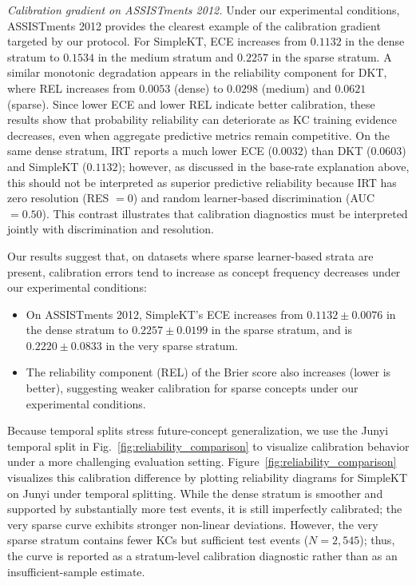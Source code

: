 \textit{Calibration gradient on ASSISTments 2012.}
Under our experimental conditions, ASSISTments 2012 provides the clearest example of the calibration gradient targeted by our protocol. For SimpleKT, ECE increases from $0.1132$ in the dense stratum to $0.1534$ in the medium stratum and $0.2257$ in the sparse stratum. A similar monotonic degradation appears in the reliability component for DKT, where REL increases from $0.0053$ (dense) to $0.0298$ (medium) and $0.0621$ (sparse). Since lower ECE and lower REL indicate better calibration, these results show that probability reliability can deteriorate as KC training evidence decreases, even when aggregate predictive metrics remain competitive. On the same dense stratum, IRT reports a much lower ECE ($0.0032$) than DKT ($0.0603$) and SimpleKT ($0.1132$); however, as discussed in the base‑rate explanation above, this should not be interpreted as superior predictive reliability because IRT has zero resolution (RES $=0$) and random learner‑based discrimination (AUC $=0.50$). This contrast illustrates that calibration diagnostics must be interpreted jointly with discrimination and resolution.

Our results suggest that, on datasets where sparse learner-based strata are present, calibration errors tend to increase as concept frequency decreases under our experimental conditions:
\begin{itemize}
    \item On ASSISTments 2012, SimpleKT's ECE increases from $0.1132 \pm 0.0076$ in the dense stratum to $0.2257 \pm 0.0199$ in the sparse stratum, and is $0.2220 \pm 0.0833$ in the very sparse stratum.
    \item The reliability component (REL) of the Brier score also increases (lower is better), suggesting weaker calibration for sparse concepts under our experimental conditions.
\end{itemize}

Because temporal splits stress future-concept generalization, we use the Junyi temporal split in Fig.~\ref{fig:reliability_comparison} to visualize calibration behavior under a more challenging evaluation setting. Figure~\ref{fig:reliability_comparison} visualizes this calibration difference by plotting reliability diagrams for SimpleKT on Junyi under temporal splitting. While the dense stratum is smoother and supported by substantially more test events, it is still imperfectly calibrated; the very sparse curve exhibits stronger non-linear deviations. However, the very sparse stratum contains fewer KCs but sufficient test events ($N = 2{,}545$); thus, the curve is reported as a stratum-level calibration diagnostic rather than as an insufficient-sample estimate.

